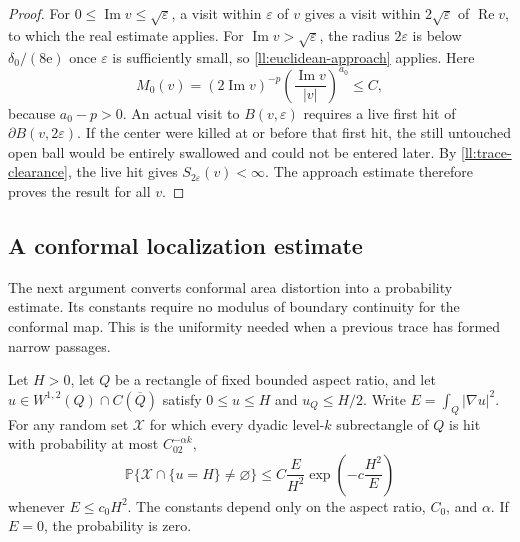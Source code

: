 \begin{proof}
For $0\le\operatorname{Im}v\le\sqrt\varepsilon$, a visit within
$\varepsilon$ of $v$ gives a visit within $2\sqrt\varepsilon$ of
$\operatorname{Re}v$, to which the real estimate applies.
For $\operatorname{Im}v>\sqrt\varepsilon$, the radius $2\varepsilon$
is below $\delta_0/(8\mathrm e)$ once $\varepsilon$ is sufficiently
small, so \eqref{ll:euclidean-approach} applies. Here
\[
 M_0(v)=(2\operatorname{Im}v)^{-p}
             \left(\frac{\operatorname{Im}v}{|v|}\right)^{a_0}
 \le C,
\]
because $a_0-p>0$.
An actual visit to $B(v,\varepsilon)$ requires a live first hit of
$\partial B(v,2\varepsilon)$.  If the center were killed at or before
that first hit, the still untouched open ball would be entirely swallowed
and could not be entered later.  By \eqref{ll:trace-clearance}, the live
hit gives $S_{2\varepsilon}(v)<\infty$.  The approach estimate therefore
proves the result for all $v$.
\end{proof}

\subsection{A conformal localization estimate}

The next argument converts conformal area distortion into a
probability estimate. Its constants require no modulus of boundary
continuity for the conformal map. This is the uniformity needed
when a previous trace has formed narrow passages.

\begin{lemma}\label{ll:rectangle}
Let $H>0$, let $Q$ be a rectangle of fixed bounded aspect ratio, and let
$u\in W^{1,2}(Q)\cap C(\overline Q)$ satisfy $0\le u\le H$
and $u_Q\le H/2$. Write $E=\int_Q|\nabla u|^2$.
For any random set $\mathcal X$ for which every dyadic level-$k$
subrectangle of $Q$ is hit with probability at most $C_02^{-\alpha k}$,
\[
 \mathbb P\{\mathcal X\cap\{u=H\}\ne\varnothing\}
 \le C\frac E{H^2}\exp\left(-c\frac{H^2}{E}\right)
\]
whenever $E\le c_0H^2$. The constants depend only on the aspect
ratio, $C_0$, and $\alpha$. If $E=0$, the probability is zero.
\end{lemma}

